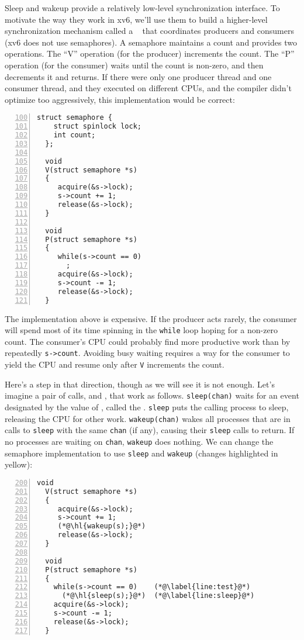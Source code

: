 Sleep and wakeup provide a relatively low-level synchronization
interface. To motivate the way they work in xv6,
we'll use them to build a higher-level
synchronization mechanism called a ~\cite{dijkstra65} that
coordinates producers and consumers
(xv6 does not use semaphores).
A semaphore maintains a count and provides two operations.
The ``V'' operation (for the producer) increments the count.
The ``P'' operation (for the consumer) waits until the count is non-zero,
and then decrements it and returns.
If there were only one producer thread and one consumer thread,
and they executed on different CPUs,
and the compiler didn't optimize too aggressively,
this implementation would be correct:
\begin{lstlisting}[numbers=left,firstnumber=100]
  struct semaphore {
    struct spinlock lock;
    int count;
  };

  void
  V(struct semaphore *s)
  {
     acquire(&s->lock);
     s->count += 1;
     release(&s->lock);
  }

  void
  P(struct semaphore *s)
  {
     while(s->count == 0)
       ;
     acquire(&s->lock);
     s->count -= 1;
     release(&s->lock);
  }
\end{lstlisting}

The implementation above 
is expensive.  If the producer acts
rarely, the consumer will spend most
of its time spinning in the 
\lstinline{while}
loop hoping for a non-zero count.
The consumer's CPU could probably find more productive work than 
by repeatedly 
\lstinline{s->count}.
Avoiding busy waiting requires
a way for the consumer to yield the CPU
and resume only after
\lstinline{V}
increments the count.

Here's a step in that direction, though as we
will see it is not enough.
Let's imagine a pair of calls, 
and
,
that work as follows.
\lstinline{sleep(chan)}
waits for an event designated by the value of
,
called the 
.
\lstinline{sleep}
puts the calling process to sleep, releasing the CPU
for other work.
\lstinline{wakeup(chan)}
wakes all processes that are in calls
to \lstinline{sleep} with the same
\lstinline{chan}
(if any), causing their
\lstinline{sleep}
calls to return.
If no processes are waiting on
\lstinline{chan},
\lstinline{wakeup}
does nothing.
We can change the semaphore implementation to use
\lstinline{sleep}
and
\lstinline{wakeup} (changes highlighted in yellow):
\begin{lstlisting}[numbers=left,firstnumber=200]
  void
  V(struct semaphore *s)
  {
     acquire(&s->lock);
     s->count += 1;
     (*@\hl{wakeup(s);}@*)
     release(&s->lock);
  }
  
  void
  P(struct semaphore *s)
  {
    while(s->count == 0)    (*@\label{line:test}@*)
      (*@\hl{sleep(s);}@*)  (*@\label{line:sleep}@*)
    acquire(&s->lock);
    s->count -= 1;
    release(&s->lock);
  }
\end{lstlisting}

